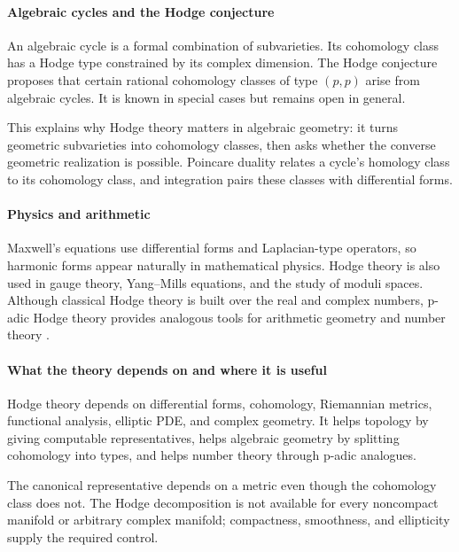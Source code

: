\paragraph{Algebraic cycles and the Hodge conjecture}
An algebraic cycle is a formal combination of subvarieties. Its cohomology class has a Hodge type constrained by its complex dimension. The Hodge conjecture proposes that certain rational cohomology classes of type $(p,p)$ arise from algebraic cycles. It is known in special cases but remains open in general.

This explains why Hodge theory matters in algebraic geometry: it turns geometric subvarieties into cohomology classes, then asks whether the converse geometric realization is possible. Poincare duality relates a cycle's homology class to its cohomology class, and integration pairs these classes with differential forms.

\paragraph{Physics and arithmetic}
Maxwell's equations use differential forms and Laplacian-type operators, so harmonic forms appear naturally in mathematical physics. Hodge theory is also used in gauge theory, Yang--Mills equations, and the study of moduli spaces. Although classical Hodge theory is built over the real and complex numbers, p-adic Hodge theory provides analogous tools for arithmetic geometry and number theory \cite{hodge_theory_ref5}.

\paragraph{What the theory depends on and where it is useful}
Hodge theory depends on differential forms, cohomology, Riemannian metrics, functional analysis, elliptic PDE, and complex geometry. It helps topology by giving computable representatives, helps algebraic geometry by splitting cohomology into types, and helps number theory through p-adic analogues.

The canonical representative depends on a metric even though the cohomology class does not. The Hodge decomposition is not available for every noncompact manifold or arbitrary complex manifold; compactness, smoothness, and ellipticity supply the required control.

